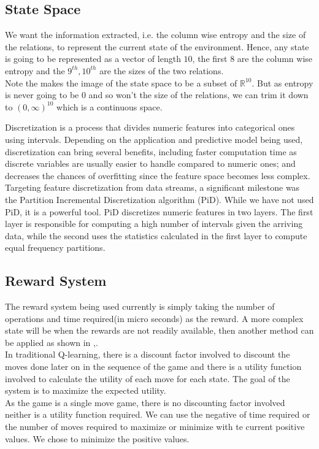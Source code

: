 \subsection{State Space}
We want the information extracted, i.e. the column wise entropy and the size of the relations, to represent the current state of the environment. Hence, any state is going to be represented as a vector of length $10$, the first $8$ are the column wise entropy and the $9^{th},10^{th}$ are the sizes of the two relations.\\
Note the makes the image of the state space to be a subset of $\mathbb{R}^{10}$. But as entropy is never going to be $0$ and so won't the size of the relations, we can trim it down to $(0,\infty)^{10}$ which is a continuous space.
\par \cite{DNN_for_stream} Discretization is a process that divides numeric features into categorical  ones  using  intervals.   Depending  on  the  application and predictive model being used, discretization can bring several benefits, including faster computation time as discrete variables are usually easier to handle compared to numeric ones; and decreases the chances of overfitting since the feature space becomes less complex. Targeting feature discretization from data streams, a significant milestone was the Partition Incremental Discretization algorithm (PiD)\cite{Pinto2005PartitionID}. While we have not used PiD, it is a powerful tool. PiD discretizes numeric features in two  layers.   The  first  layer  is  responsible  for  computing  a high number of intervals given the arriving data, while the second uses the statistics calculated in the first layer to compute equal frequency partitions.

\subsection{Reward System}
The reward system being used currently is simply taking the number of operations and time required(in micro seconds) as the reward. A more complex state will be when the rewards are not readily available, then another method can be applied as shown in \cite{know_unknown_rewards},\cite{DRL_rewards_problem}.\\
In traditional Q-learning, there is a discount factor involved to discount the moves done later on in the sequence of the game and there is a utility function involved to calculate the utility of each move for each state. The goal of the system is to maximize the expected utility.\\
As the game is a single move game, there is no discounting factor involved neither is a utility function required. We can use the negative of time required or the number of moves required to maximize or minimize with te current positive values. We chose to minimize the positive values.

